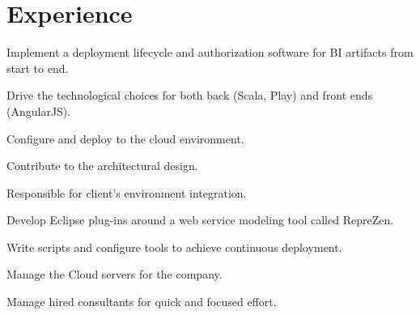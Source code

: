 \documentclass[letterpaper]{deedy-resume} %
\begin{document}
\begin{minipage}[t]{0.66\textwidth} %


\section{Experience}


\vspace{\topsep} %
\begin{tightitemize}
\item Implement a deployment lifecycle and authorization software for BI artifacts from start to end.
\item Drive the technological choices for both back (Scala, Play) and front ends (AngularJS).
\item Configure and deploy to the cloud environment.
\item Contribute to the architectural design.
\end{tightitemize}

\sectionspace %



\begin{tightitemize}
\item Responsible for client's environment integration.
\item Develop Eclipse plug-ins around a web service modeling tool called RepreZen.
\item Write scripts and configure tools to achieve continuous deployment.
\item Manage the Cloud servers for the company.
\item Manage hired consultants for quick and focused effort.
\end{tightitemize}

\sectionspace %



\end{minipage}
\end{document}
